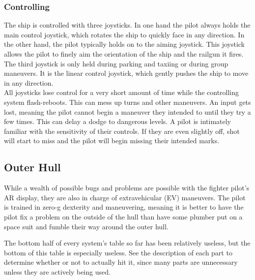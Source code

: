 \documentclass[a4paper]{article}
\begin{document}
\vspace{-0.5cm} \hspace{-18pt} \subsubsection{Controlling} \label{fighter_controlling} \vspace{-0.2cm}
The ship is controlled with three joysticks. In one hand the pilot always holds the main control joystick, which rotates the ship to quickly face in any direction. In the other hand, the pilot typically holds on to the aiming joystick. This joystick allows the pilot to finely aim the orientation of the ship and the railgun it fires. The third joystick is only held during parking and taxiing or during group maneuvers. It is the linear control joystick, which gently pushes the ship to move in any direction.
\\ \cci
{All joysticks lose control for a very short amount of time while the controlling system flash-reboots. This can mess up turns and other maneuvers.}
{An input gets lost, meaning the pilot cannot begin a maneuver they intended to until they try a few times. This can delay a dodge to dangerous levels.}
{A pilot is intimately familiar with the sensitivity of their controls. If they are even slightly off, shot will start to miss and the pilot will begin missing their intended marks.}


\newpage
\subsection{Outer Hull} \label{outer}

While a wealth of possible bugs and problems are possible with the fighter pilot's AR display, they are also in charge of extravehicular (EV) maneuvers. The pilot is trained in zero-g dexterity and maneuvering, meaning it is better to have the pilot fix a problem on the outside of the hull than have some plumber put on a space suit and fumble their way around the outer hull.

The bottom half of every system's table so far has been relatively useless, but the bottom of this table is especially useless. See the description of each part to determine whether or not to actually hit it, since many parts are unnecessary unless they are actively being used.
\end{document}
